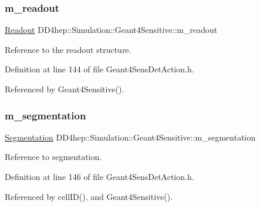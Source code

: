 \subsubsection{\texorpdfstring{m\+\_\+readout}{m\_readout}}
{\footnotesize\ttfamily \hyperlink{class_d_d4hep_1_1_simulation_1_1_geant4_sensitive_a2dc0e9ab41aeebbb0bad179419eeac72}{Readout} D\+D4hep\+::\+Simulation\+::\+Geant4\+Sensitive\+::m\+\_\+readout\hspace{0.3cm}{\ttfamily [protected]}}



Reference to the readout structure. 



Definition at line 144 of file Geant4\+Sens\+Det\+Action.\+h.



Referenced by Geant4\+Sensitive().

\hypertarget{class_d_d4hep_1_1_simulation_1_1_geant4_sensitive_ab7817460de763632e629982ca4c2c847}{}\label{class_d_d4hep_1_1_simulation_1_1_geant4_sensitive_ab7817460de763632e629982ca4c2c847} 
\subsubsection{\texorpdfstring{m\+\_\+segmentation}{m\_segmentation}}
{\footnotesize\ttfamily \hyperlink{class_d_d4hep_1_1_simulation_1_1_geant4_sensitive_ac898770dc0c398f3b7b88d1bf5f72314}{Segmentation} D\+D4hep\+::\+Simulation\+::\+Geant4\+Sensitive\+::m\+\_\+segmentation\hspace{0.3cm}{\ttfamily [protected]}}



Reference to segmentation. 



Definition at line 146 of file Geant4\+Sens\+Det\+Action.\+h.



Referenced by cell\+I\+D(), and Geant4\+Sensitive().

\hypertarget{class_d_d4hep_1_1_simulation_1_1_geant4_sensitive_a02ba3b720aadf6e230b6c2c0cd258b2b}{}\label{class_d_d4hep_1_1_simulation_1_1_geant4_sensitive_a02ba3b720aadf6e230b6c2c0cd258b2b} 
